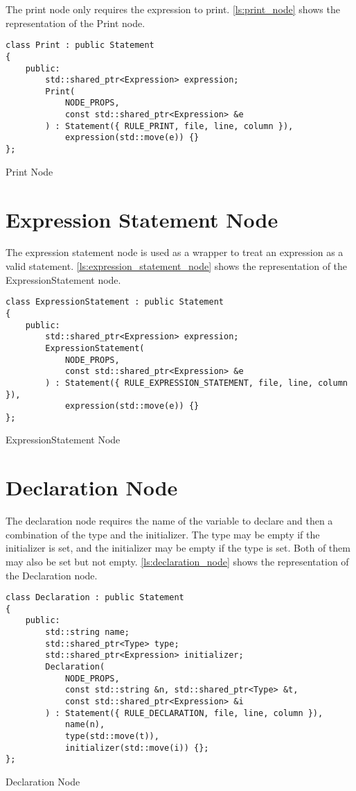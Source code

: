 The print node only requires the expression to print.
\autoref{ls:print_node} shows the representation of the Print node.

\begin{listing}[H]
\begin{verbatim}
class Print : public Statement
{
    public:
        std::shared_ptr<Expression> expression;
        Print(
            NODE_PROPS,
            const std::shared_ptr<Expression> &e
        ) : Statement({ RULE_PRINT, file, line, column }),
            expression(std::move(e)) {}
};
\end{verbatim}
\caption{Print Node}
\label{ls:print_node}
\end{listing}

\section{Expression Statement Node}

The expression statement node is used as a wrapper to treat an expression as a valid statement.
\autoref{ls:expression_statement_node} shows the representation of the ExpressionStatement node.

\begin{listing}[H]
\begin{verbatim}
class ExpressionStatement : public Statement
{
    public:
        std::shared_ptr<Expression> expression;
        ExpressionStatement(
            NODE_PROPS,
            const std::shared_ptr<Expression> &e
        ) : Statement({ RULE_EXPRESSION_STATEMENT, file, line, column }),
            expression(std::move(e)) {}
};
\end{verbatim}
\caption{ExpressionStatement Node}
\label{ls:expression_statement_node}
\end{listing}

\section{Declaration Node}

The declaration node requires the name of the variable to declare and then a combination of the type and the initializer.
The type may be empty if the initializer is set, and the initializer may be empty if the type is set. Both of them may also be set
but not empty.
\autoref{ls:declaration_node} shows the representation of the Declaration node.

\begin{listing}[H]
\begin{verbatim}
class Declaration : public Statement
{
    public:
        std::string name;
        std::shared_ptr<Type> type;
        std::shared_ptr<Expression> initializer;
        Declaration(
            NODE_PROPS,
            const std::string &n, std::shared_ptr<Type> &t,
            const std::shared_ptr<Expression> &i
        ) : Statement({ RULE_DECLARATION, file, line, column }),
            name(n),
            type(std::move(t)),
            initializer(std::move(i)) {};
};
\end{verbatim}
\caption{Declaration Node}
\label{ls:declaration_node}
\end{listing}

